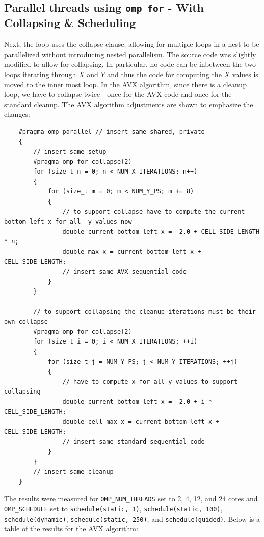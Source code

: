 \documentclass{article}
\begin{document}
\subsection{Parallel threads using \texttt{omp for} - With Collapsing \& Scheduling}
Next, the loop uses the collapse clause; allowing for multiple loops in a nest to 
be parallelized without introducing nested parallelism. The source code was slightly 
modified to allow for collapsing. In particular, no code can be inbetween the two loops 
iterating through $X$ and $Y$ and thus the code for computing the $X$ values is moved to the 
inner most loop. In the AVX algorithm, since there is a cleanup loop, we have to collapse twice - once for the AVX code and once for the standard cleanup.
The AVX algorithm adjustments are shown to emphasize the changes:
\newpage
\begin{lstlisting}
    #pragma omp parallel // insert same shared, private
    {
        // insert same setup
        #pragma omp for collapse(2)
        for (size_t n = 0; n < NUM_X_ITERATIONS; n++)
        {
            for (size_t m = 0; m < NUM_Y_PS; m += 8)
            {
                // to support collapse have to compute the current bottom left x for all  y values now
                double current_bottom_left_x = -2.0 + CELL_SIDE_LENGTH * n;
                double max_x = current_bottom_left_x + CELL_SIDE_LENGTH;
                // insert same AVX sequential code
            }
        }

        // to support collapsing the cleanup iterations must be their own collapse
        #pragma omp for collapse(2)
        for (size_t i = 0; i < NUM_X_ITERATIONS; ++i)
        {
            for (size_t j = NUM_Y_PS; j < NUM_Y_ITERATIONS; ++j)
            {
                // have to compute x for all y values to support collapsing
                double current_bottom_left_x = -2.0 + i * CELL_SIDE_LENGTH;
                double cell_max_x = current_bottom_left_x + CELL_SIDE_LENGTH;
                // insert same standard sequential code
            }
        }
        // insert same cleanup
    }
\end{lstlisting}
The results were measured for \texttt{OMP\_NUM\_THREADS} set to 2, 4, 12, and 24 cores and \texttt{OMP\_SCHEDULE} set to
\texttt{schedule(static, 1)}, \texttt{schedule(static, 100)}, \texttt{schedule(dynamic)}, \texttt{schedule(static, 250)}, and \texttt{schedule(guided)}. Below 
is a table of the results for the AVX algorithm:
\end{document}
